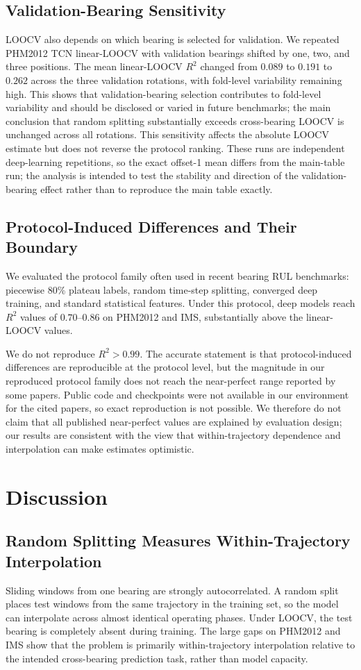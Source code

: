 \documentclass[pdflatex,sn-mathphys-num]{sn-jnl}
\begin{document}
\subsection{Validation-Bearing Sensitivity}
LOOCV also depends on which bearing is selected for validation. We repeated PHM2012 TCN linear-LOOCV with validation bearings shifted by one, two, and three positions. The mean linear-LOOCV $R^2$ changed from $0.089$ to $0.191$ to $0.262$ across the three validation rotations, with fold-level variability remaining high. This shows that validation-bearing selection contributes to fold-level variability and should be disclosed or varied in future benchmarks; the main conclusion that random splitting substantially exceeds cross-bearing LOOCV is unchanged across all rotations. This sensitivity affects the absolute LOOCV estimate but does not reverse the protocol ranking. These runs are independent deep-learning repetitions, so the exact offset-1 mean differs from the main-table run; the analysis is intended to test the stability and direction of the validation-bearing effect rather than to reproduce the main table exactly.

\subsection{Protocol-Induced Differences and Their Boundary}
We evaluated the protocol family often used in recent bearing RUL benchmarks: piecewise 80\% plateau labels, random time-step splitting, converged deep training, and standard statistical features. Under this protocol, deep models reach $R^2$ values of $0.70$--$0.86$ on PHM2012 and IMS, substantially above the linear-LOOCV values.

We do not reproduce $R^2>0.99$. The accurate statement is that protocol-induced differences are reproducible at the protocol level, but the magnitude in our reproduced protocol family does not reach the near-perfect range reported by some papers. Public code and checkpoints were not available in our environment for the cited papers, so exact reproduction is not possible. We therefore do not claim that all published near-perfect values are explained by evaluation design; our results are consistent with the view that within-trajectory dependence and interpolation can make estimates optimistic.

\section{Discussion}
\subsection{Random Splitting Measures Within-Trajectory Interpolation}
Sliding windows from one bearing are strongly autocorrelated. A random split places test windows from the same trajectory in the training set, so the model can interpolate across almost identical operating phases. Under LOOCV, the test bearing is completely absent during training. The large gaps on PHM2012 and IMS show that the problem is primarily within-trajectory interpolation relative to the intended cross-bearing prediction task, rather than model capacity.
\end{document}

